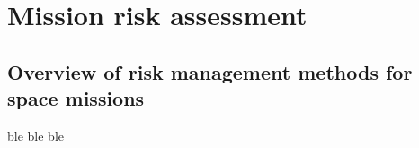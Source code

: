 \chapter{Mission risk assessment}
\section{Overview of risk management methods for space missions}
ble ble ble
